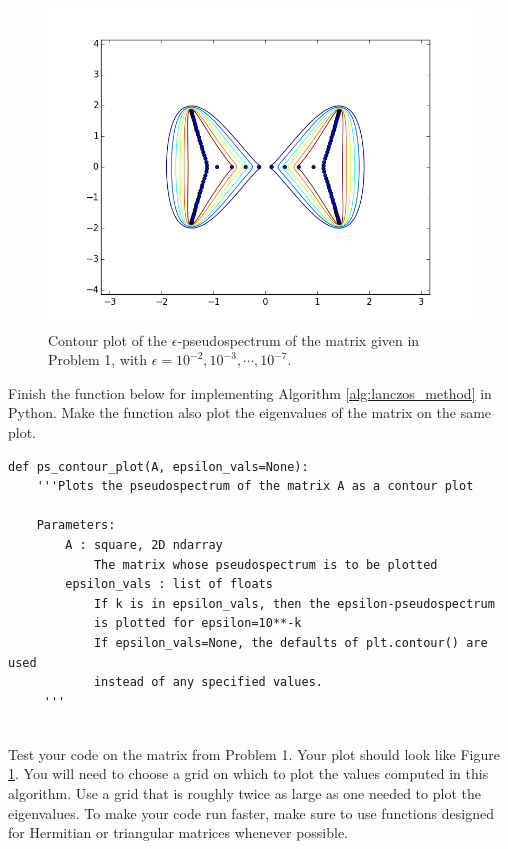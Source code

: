 \begin{figure}
\begin{center}
\includegraphics[width=\textwidth]{ps_contour}
\caption{Contour plot of the $\epsilon$-pseudospectrum of the matrix given in Problem 1, with $\epsilon=10^{-2},10^{-3},\cdots,10^{-7}$. }
\label{fig:ps_contour}
\end{center}
\end{figure}



\begin{problem}
Finish the function below for implementing Algorithm \ref{alg:lanczos_method} in Python. Make the function also plot the eigenvalues of the matrix on the same plot.

\begin{lstlisting}
def ps_contour_plot(A, epsilon_vals=None):
    '''Plots the pseudospectrum of the matrix A as a contour plot
    
    Parameters:
        A : square, 2D ndarray
            The matrix whose pseudospectrum is to be plotted
        epsilon_vals : list of floats
            If k is in epsilon_vals, then the epsilon-pseudospectrum
            is plotted for epsilon=10**-k
            If epsilon_vals=None, the defaults of plt.contour() are used
            instead of any specified values.
     '''
    
\end{lstlisting}

Test your code on the matrix from Problem 1. Your plot should look like Figure \ref{fig:ps_contour}. You will need to choose a grid on which to plot the values computed in this algorithm. Use a grid that is roughly twice as large as one needed to plot the eigenvalues. To make your code run faster, make sure to use functions designed for Hermitian or triangular matrices whenever possible.

\end{problem}

